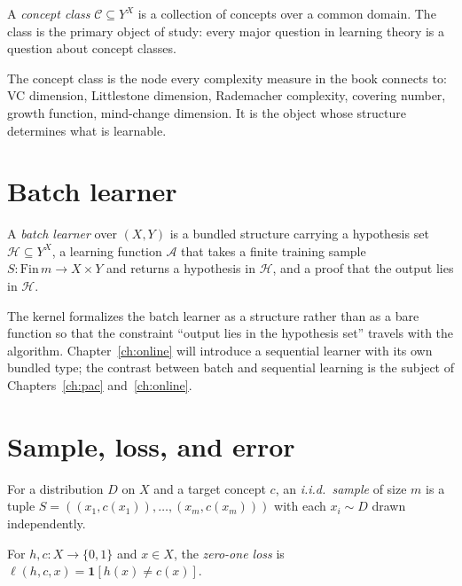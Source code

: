 \begin{defn}
\label{def:concept-class}
  \leanok
A \emph{concept class} $\mathcal{C} \subseteq Y^X$ is a collection of
concepts over a common domain. The class is the primary object of
study: every major question in learning theory is a question about
concept classes.
\end{defn}

The concept class is the node every complexity measure in the book
connects to: VC dimension, Littlestone dimension, Rademacher
complexity, covering number, growth function, mind-change dimension.
It is the object whose structure determines what is learnable.

\section{Batch learner}\label{sec:batch-learner}

\begin{defn}
\label{def:batch-learner}
  \leanok
A \emph{batch learner} over $(X, Y)$ is a bundled structure carrying a
hypothesis set $\mathcal{H} \subseteq Y^X$, a learning function
$\mathcal{A}$ that takes a finite training sample
$S : \mathrm{Fin}\,m \to X \times Y$ and returns a hypothesis in
$\mathcal{H}$, and a proof that the output lies in $\mathcal{H}$.
\end{defn}

The kernel formalizes the batch learner as a structure rather than as
a bare function so that the constraint ``output lies in the hypothesis
set'' travels with the algorithm. Chapter~\ref{ch:online} will
introduce a sequential learner with its own bundled type; the contrast
between batch and sequential learning is the subject of
Chapters~\ref{ch:pac} and~\ref{ch:online}.

\section{Sample, loss, and error}\label{sec:sample-loss}

\begin{defn}[I.i.d.\ sample]
\label{def:iid-sample}
For a distribution $D$ on $X$ and a target concept $c$, an
\emph{i.i.d.\ sample} of size $m$ is a tuple
$S = ((x_1, c(x_1)), \dots, (x_m, c(x_m)))$ with each $x_i \sim D$
drawn independently.
\end{defn}

\begin{defn}
\label{def:zero-one-loss}
For $h, c : X \to \{0,1\}$ and $x \in X$, the \emph{zero-one loss} is
$\ell(h, c, x) = \mathbf{1}[h(x) \neq c(x)]$.
\end{defn}

